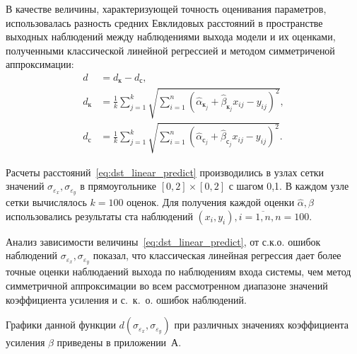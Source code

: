 В качестве величины, характеризующей точность оценивания параметров,
использовалась разность средних Евклидовых расстояний в пространстве выходных наблюдений
между наблюдениями выхода модели и их оценками,
полученными классической линейной регрессией и методом симметриченой аппроксимации:
\begin{equation}
  \begin{aligned}
    d &= d_{\text{к}} - d_{\text{с}}, \\
    d_{\text{к}} &= \frac{1}{k} \sum_{j=1}^k \sqrt{ \sum_{i=1}^n (\hat{\alpha}_{\text{к}_j} + \hat{\beta}_{\text{к}_j} x_{ij} - y_{ij})^2}, \\
    d_{\text{с}} &= \frac{1}{k} \sum_{j=1}^k \sqrt{ \sum_{i=1}^n (\hat{\alpha}_{\text{с}_j} + \hat{\beta}_{\text{с}_j} x_{ij} - y_{ij})^2}.
    \end{aligned}
  \label{eq:dst_linear_predict}
\end{equation}

Расчеты расстояний~\eqref{eq:dst_linear_predict} производились в узлах сетки значений
\( \sigma_{\varepsilon_x}, \sigma_{\varepsilon_y} \) в прямоугольнике
\( [0, 2] \times [0, 2] \) с шагом 0{,}1.
В каждом узле сетки вычислялось \( k = 100 \) оценок.
Для получения каждой оценки \( \hat{\alpha}, \hat{\beta} \) использовались результаты
ста наблюдений \( ( x_i, y_i ), i = \overline{1, n}, n = 100 \).

Анализ зависимости величины~\eqref{eq:dst_linear_predict},
от с.к.о. ошибок наблюдений \( \sigma_{\varepsilon_x}, \sigma_{\varepsilon_y} \) показал, что
классическая линейная регрессия дает более точные оценки наблюдаений выхода по
наблюдениям входа системы, чем метод симметричной аппроксимации
во всем рассмотренном диапазоне значений коэффициента усиления и с.~к.~о. ошибок наблюдений.

Графики данной функции \( d(\sigma_{\varepsilon_x}, \sigma_{\varepsilon_y}) \)
при различных значениях коэффициента усиления \( \beta \) приведены в приложении~А.
